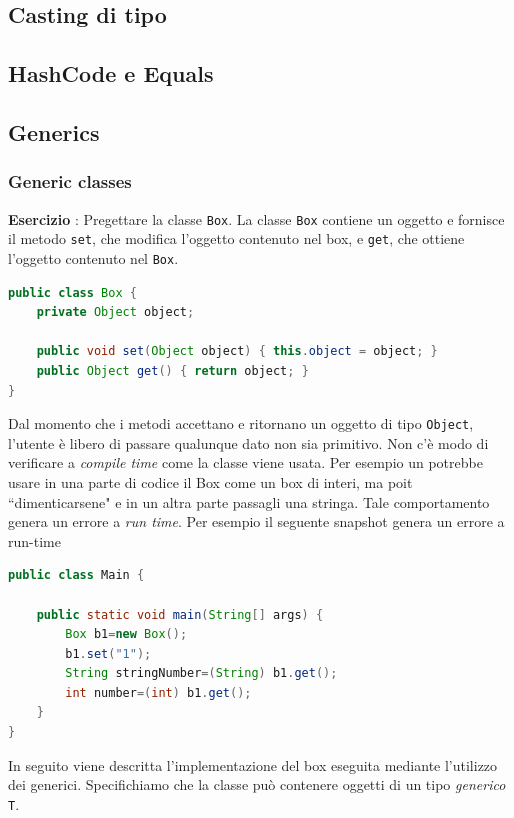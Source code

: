\documentclass{article}
\begin{document}
\subsection{Casting di tipo}

\subsection{HashCode e Equals}
\subsection{Generics}
\subsubsection{Generic classes}
\begin{framed}
\textbf{Esercizio }: Pregettare la classe \texttt{Box}. La classe \texttt{Box} contiene un oggetto e fornisce il metodo \texttt{set}, che modifica l'oggetto contenuto nel box, e  \texttt{get}, che ottiene l'oggetto contenuto nel \texttt{Box}.
\end{framed}

\begin{lstlisting}[language=Java]
public class Box {
    private Object object;

    public void set(Object object) { this.object = object; }
    public Object get() { return object; }
}
\end{lstlisting}
Dal momento che i metodi accettano e ritornano un oggetto di tipo \texttt{Object}, l'utente \`e libero di passare qualunque dato non sia primitivo. Non c'\`e modo di verificare a \emph{compile time} come la classe viene usata. Per esempio un potrebbe usare in una parte di codice il Box come un box di interi, ma poit ``dimenticarsene" e in un altra parte passagli una stringa. Tale comportamento genera un errore a \emph{run time}. Per esempio il seguente snapshot genera un errore a run-time 
\begin{lstlisting}[language=Java]
public class Main {

	public static void main(String[] args) {
		Box b1=new Box();
		b1.set("1");
		String stringNumber=(String) b1.get();
		int number=(int) b1.get();
	}
}
\end{lstlisting}
In seguito viene descritta l'implementazione del box eseguita mediante l'utilizzo dei generici. Specifichiamo che la classe pu\`o contenere oggetti di un tipo \emph{generico} \texttt{T}. 
\end{document}
